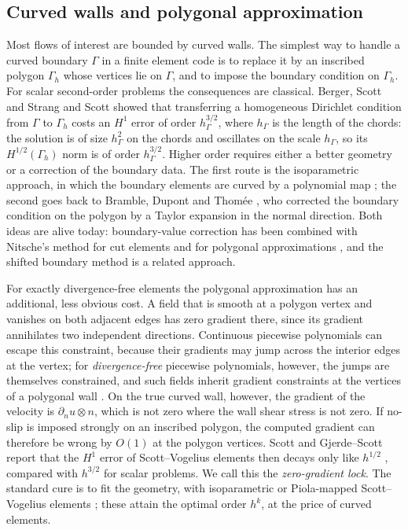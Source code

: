 \documentclass[pdflatex,sn-mathphys-num]{sn-jnl}
\theoremstyle{thmstyleone}
\theoremstyle{thmstylethree}
\newcommand{\hG}{h_\Gamma}
\newcommand{\Gh}{\Gamma_h}
\newcommand{\dn}{\partial_n}
\begin{document}
\subsection{Curved walls and polygonal approximation}
Most flows of interest are bounded by curved walls. The simplest way to handle a curved boundary $\Gamma$ in a finite element code is to replace it by an inscribed polygon $\Gh$ whose vertices lie on $\Gamma$, and to impose the boundary condition on $\Gh$. For scalar second-order problems the consequences are classical. Berger, Scott and Strang \cite{BergerScottStrang1972} and Scott \cite{Scott1975} showed that transferring a homogeneous Dirichlet condition from $\Gamma$ to $\Gh$ costs an $H^1$ error of order $\hG^{3/2}$, where $\hG$ is the length of the chords: the solution is of size $\hG^2$ on the chords and oscillates on the scale $\hG$, so its $H^{1/2}(\Gh)$ norm is of order $\hG^{3/2}$. Higher order requires either a better geometry or a correction of the boundary data. The first route is the isoparametric approach, in which the boundary elements are curved by a polynomial map \cite{Ciarlet1978book}; the second goes back to Bramble, Dupont and Thom\'ee \cite{BrambleDupontThomee1972}, who corrected the boundary condition on the polygon by a Taylor expansion in the normal direction. Both ideas are alive today: boundary-value correction has been combined with Nitsche's method for cut elements \cite{BurmanHansboLarson2018,BurmanHansboLarson2019Stokes} and for polygonal approximations \cite{DupontGuzmanScott2025}, and the shifted boundary method \cite{MainScovazzi2018} is a related approach.

For exactly divergence-free elements the polygonal approximation has an additional, less obvious cost. A field that is smooth at a polygon vertex and vanishes on both adjacent edges has zero gradient there, since its gradient annihilates two independent directions. Continuous piecewise polynomials can escape this constraint, because their gradients may jump across the interior edges at the vertex; for \emph{divergence-free} piecewise polynomials, however, the jumps are themselves constrained, and such fields inherit gradient constraints at the vertices of a polygonal wall \cite{ScottPrize,GjerdeScott2024}. On the true curved wall, however, the gradient of the velocity is $\dn u\otimes n$, which is not zero where the wall shear stress is not zero. If no-slip is imposed strongly on an inscribed polygon, the computed gradient can therefore be wrong by $O(1)$ at the polygon vertices. Scott and Gjerde--Scott report that the $H^1$ error of Scott--Vogelius elements then decays only like $h^{1/2}$ \cite{ScottPrize,GjerdeScott2024}, compared with $h^{3/2}$ for scalar problems. We call this the \emph{zero-gradient lock}. The standard cure is to fit the geometry, with isoparametric or Piola-mapped Scott--Vogelius elements \cite{NeilanOtus2021,DurstNeilan2024}; these attain the optimal order $h^k$, at the price of curved elements.
\end{document}

